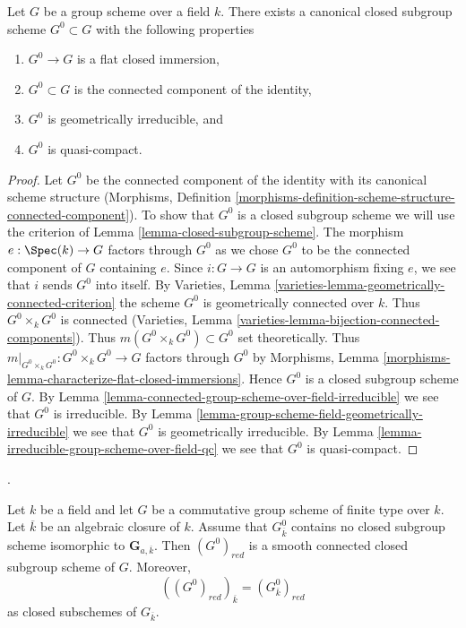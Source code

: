 \begin{proposition}
\label{proposition-connected-component}
Let $G$ be a group scheme over a field $k$. There exists a canonical closed
subgroup scheme $G^0 \subset G$ with the following properties
\begin{enumerate}
\item $G^0 \to G$ is a flat closed immersion,
\item $G^0 \subset G$ is the connected component of the identity,
\item $G^0$ is geometrically irreducible, and
\item $G^0$ is quasi-compact.
\end{enumerate}
\end{proposition}

\begin{proof}
Let $G^0$ be the connected component of the identity with its canonical
scheme structure (Morphisms, Definition
\ref{morphisms-definition-scheme-structure-connected-component}).
To show that $G^0$ is a closed subgroup scheme we will use the
criterion of Lemma \ref{lemma-closed-subgroup-scheme}.
The morphism $e : \Spec(k) \to G$ factors through $G^0$ as we chose
$G^0$ to be the connected component of $G$ containing $e$.
Since $i : G \to G$ is an automorphism fixing $e$, we see that
$i$ sends $G^0$ into itself.
By Varieties, Lemma \ref{varieties-lemma-geometrically-connected-criterion}
the scheme $G^0$ is geometrically connected over $k$.
Thus $G^0 \times_k G^0$ is connected
(Varieties, Lemma \ref{varieties-lemma-bijection-connected-components}).
Thus $m(G^0 \times_k G^0) \subset G^0$ set theoretically.
Thus $m|_{G^0 \times_k G^0} : G^0 \times_k G^0 \to G$
factors through $G^0$ by
Morphisms, Lemma \ref{morphisms-lemma-characterize-flat-closed-immersions}.
Hence $G^0$ is a closed subgroup scheme of $G$.
By Lemma \ref{lemma-connected-group-scheme-over-field-irreducible}
we see that $G^0$ is irreducible. By
Lemma \ref{lemma-group-scheme-field-geometrically-irreducible}
we see that $G^0$ is geometrically irreducible. By
Lemma \ref{lemma-irreducible-group-scheme-over-field-qc}
we see that $G^0$ is quasi-compact.
\end{proof}

\begin{lemma}
\label{lemma-reduced-identity-component-no-additive}
\begin{reference}
\cite[Expos\'e 236, Proposition 3.1, p. 236 and correction,
p. 303]{FGA}.
\end{reference}
Let $k$ be a field and let $G$ be a commutative group scheme of finite type
over $k$. Let $\overline{k}$ be an algebraic closure of $k$. Assume that
$G^0_{\overline{k}}$ contains no closed subgroup scheme isomorphic to
$\mathbf{G}_{a, \overline{k}}$. Then $(G^0)_{red}$ is a smooth connected
closed subgroup scheme of $G$. Moreover,
$$
((G^0)_{red})_{\overline{k}}=(G^0_{\overline{k}})_{red}
$$
as closed subschemes of $G_{\overline{k}}$.
\end{lemma}

